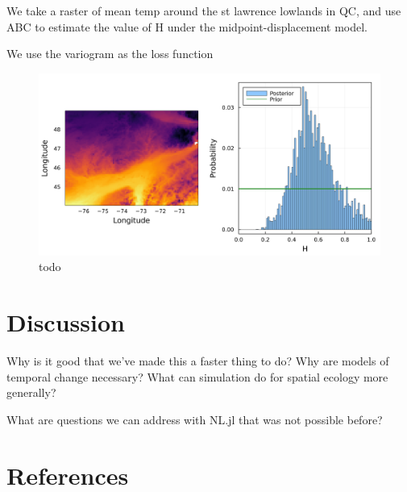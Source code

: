 \documentclass[11pt]{article}
\makeatletter
\def\maxwidth{\ifdim\Gin@nat@width>\linewidth\linewidth
\else\Gin@nat@width\fi}
\let\Oldincludegraphics\includegraphics
\renewcommand{\includegraphics}[1]{\Oldincludegraphics[width=\maxwidth]{#1}}
\makeatother
\begin{document}
We take a raster of mean temp around the st lawrence lowlands in QC, and
use ABC to estimate the value of H under the midpoint-displacement
model.

We use the variogram as the loss function

\begin{figure}
\hypertarget{fig:post}{%
\centering
\includegraphics{./figures/posterior.png}
\caption{todo}\label{fig:post}
}
\end{figure}

\hypertarget{discussion}{%
\section{Discussion}\label{discussion}}

Why is it good that we've made this a faster thing to do? Why are models
of temporal change necessary? What can simulation do for spatial ecology
more generally?

What are questions we can address with NL.jl that was not possible
before?

\hypertarget{references}{%
\section*{References}\label{references}}
\end{document}
